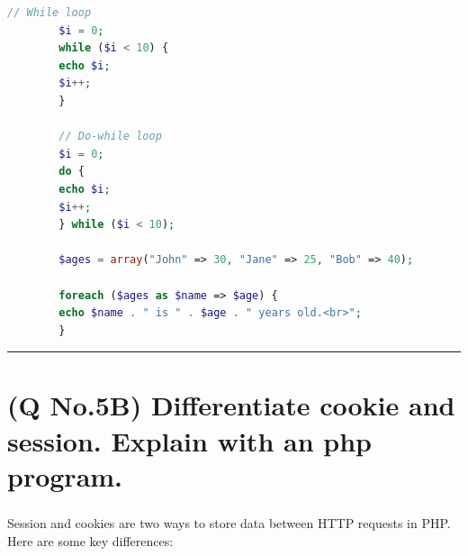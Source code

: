 \documentclass[11pt]{article}
\begin{document}
\begin{itemize}
\begin{lstlisting}[language=php]
        // While loop
        $i = 0;
        while ($i < 10) {
        echo $i;
        $i++;
        }

        // Do-while loop
        $i = 0;
        do {
        echo $i;
        $i++;
        } while ($i < 10);

        $ages = array("John" => 30, "Jane" => 25, "Bob" => 40);

        foreach ($ages as $name => $age) {
        echo $name . " is " . $age . " years old.<br>";
        }


    \end{lstlisting}

\end{itemize}


\noindent\rule{\linewidth}{0.4pt}
\section{(Q No.5B) Differentiate cookie and session. Explain with an php program.} 
\subparagraph{}

Session and cookies are two ways to store data between HTTP requests in PHP. Here are some key differences:
\end{document}
